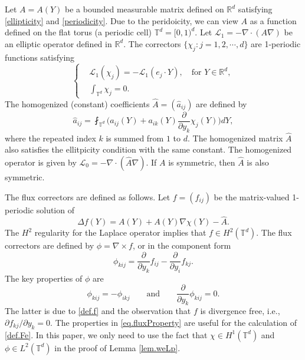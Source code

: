 \documentclass[reqno,12pt]{amsart} %
\theoremstyle{definition}
\theoremstyle{remark}
\numberwithin{equation}{section}
\newcommand{\cL}{\mathcal{L}}
\newcommand{\R}{\mathbb{R}}
\newcommand{\T}{\mathbb{T}}
\begin{document}
Let $A = A(Y)$ be a bounded measurable matrix defined on $\R^d$ satisfying \eqref{ellipticity} and \eqref{periodicity}. Due to the peridoicity, we can view $A$ as a function defined on the flat torus (a periodic cell) $\T^d = [0,1)^d$. Let $\cL_1 = -\nabla\cdot (A \nabla)$ be an elliptic operator defined in $\R^d$. The correctors $\{ \chi_j: j=1,2,\cdots, d\}$ are 1-periodic functions satisfying
\begin{equation}
    \left\{
    \begin{aligned}
        & \cL_1 (\chi_j) = -\cL_1(e_j\cdot Y), \quad \text{for } Y \in \R^d, \\
        & \int_{\T^d} \chi_j = 0.
    \end{aligned}
    \right.
\end{equation}
The homogenized (constant) coefficients $\widehat{A} = (\widehat{a}_{ij})$ are defined by
\begin{equation}\label{eq.hatA}
    \widehat{a}_{ij} = \fint_{\T^d} \Big(a_{ij}(Y) + a_{ik}(Y) \frac{\partial}{\partial y_k} \chi_j(Y) \Big) dY,
\end{equation}
where the repeated index $k$ is summed from $1$ to $d$. The homogenized matrix $\widehat{A}$ also satisfies the ellitpicity condition with the same constant. The homogenized operator is given by $\cL_0 = - \nabla\cdot (\widehat{A} \nabla)$. If $A$ is symmetric, then $\widehat{A}$ is also symmetric.

The flux correctors are defined as follows. Let $f = (f_{ij})$ be the matrix-valued 1-periodic solution of
\begin{equation}\label{def.f}
    \Delta f(Y) = A(Y) + A(Y) \nabla \chi(Y) - \widehat{A}.
\end{equation}
The $H^2$ regularity for the Laplace operator implies that $f \in H^2(\T^d)$. The flux correctors are defined by $\phi = \nabla \times f$, or in the component form
\begin{equation}
    \phi_{kij} = \frac{\partial}{\partial y_k} f_{ij} - \frac{\partial}{\partial y_i} f_{kj}.
\end{equation}
The key properties of $\phi$ are
\begin{equation}\label{eq.fluxProperty}
    \phi_{kij} = -\phi_{ikj} \qquad \text{and} \qquad \frac{\partial }{\partial y_k} \phi_{kij} = 0.
\end{equation}
The latter is due to \eqref{def.f} and the observation that $f$ is divergence free, i.e., $\partial f_{kj}/\partial y_k = 0$. The properties in \eqref{eq.fluxProperty} are useful for the calculation of \eqref{def.Fe}. In this paper, we only need to use the fact that $\chi \in H^1(\T^d)$ and $\phi \in L^2(\T^d)$ in the proof of Lemma \ref{lem.weLp}.
\end{document}
